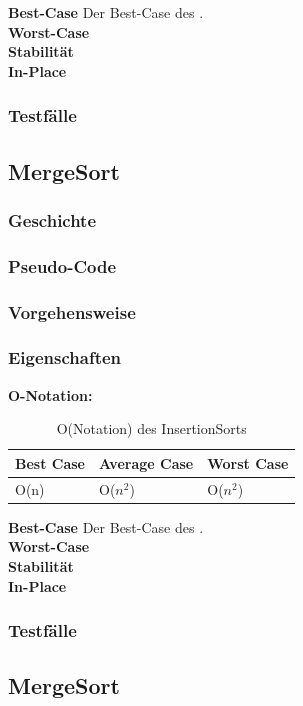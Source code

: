 \documentclass{article}
\begin{document}
\textbf{Best-Case} Der Best-Case des . \\
\textbf{Worst-Case} \\
\textbf{Stabilität}  \\

\textbf{In-Place}  \\
\subsubsection{Testfälle}

\subsection{MergeSort}
\subsubsection{Geschichte}
\subsubsection{Pseudo-Code}
\subsubsection{Vorgehensweise}
\subsubsection{Eigenschaften}
\textbf{O-Notation:}
\begin{table}
\centering
\begin{tabular}{lll}
	\hline
	\textbf{Best Case} & \textbf{Average Case} & \textbf{Worst Case} \\
	\hline
	O(n) & O($n^{2}$) & O($n^{2}$) \\
	\hline
\end{tabular}
\caption{O(Notation) des InsertionSorts}
\label{tab:InsertioneSort}
\end{table}

\textbf{Best-Case} Der Best-Case des . \\
\textbf{Worst-Case} \\
\textbf{Stabilität}  \\

\textbf{In-Place}  \\
\subsubsection{Testfälle}

\subsection{MergeSort}
\end{document}
